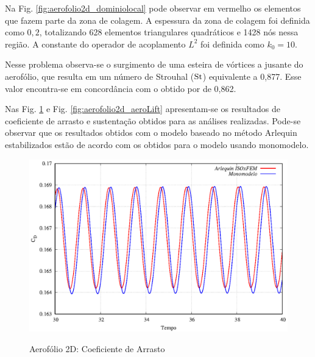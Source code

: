 \documentclass[tese_patricia]{subfiles}
\begin{document}
Na Fig. \ref{fig:aerofolio2d_dominiolocal} pode observar em vermelho os elementos que fazem parte da zona de colagem. A espessura da zona de colagem foi definida como $0,2$, totalizando 628 elementos triangulares quadráticos e 1428 nós nessa região. A constante do operador de acoplamento $L^{2}$ foi definida como $k_{0} = 10$. 


Nesse problema observa-se o surgimento de uma esteira de vórtices a jusante do aerofólio, que resulta em um número de Strouhal ($\mathrm{St}$) equivalente a 0,877. Esse valor encontra-se em concordância com o obtido por  de 0,862. 

Nas Fig. \ref{fig:aerofolio2d_aeroDrag} e Fig. \ref{fig:aerofolio2d_aeroLift} apresentam-se os resultados de coeficiente de arrasto e sustentação obtidos para as análises realizadas. Pode-se observar que os resultados obtidos com o modelo baseado no método Arlequin estabilizados estão de acordo com os obtidos para o modelo usando monomodelo.


\begin{figure}[htb!]
	\centering 
	{\includegraphics[scale=1.0,trim=0cm 0cm 0cm 0cm, clip=true]{Imagens/Cap6/DragRe.eps}}	
	\caption{Aerofólio 2D: Coeficiente de Arrasto}
	\label{fig:aerofolio2d_aeroDrag}
\end{figure}
\end{document}
